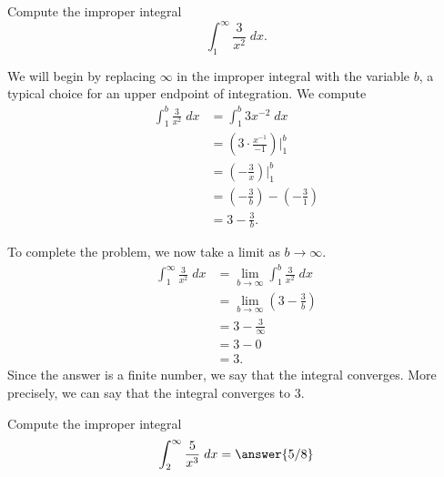 \documentclass{ximera}
\begin{document}
\begin{example}
Compute the improper integral
\[
\int_1^\infty \frac{3}{x^2} \; dx.
\]

We will begin by replacing $\infty$ in the improper integral with the variable $b$, a typical choice for an upper endpoint of integration.
We compute
\begin{align*}
\int_1^b \frac{3}{x^2} \; dx &= \int_1^b 3x^{-2} \; dx\\
                           &= \left(3\cdot \frac{x^{-1}}{-1} \right) \bigg|_1^b\\
                           &= \left(-\frac{3}{x} \right) \bigg|_1^b\\
                       &= \left(-\frac{3}{b} \right) - \left(-\frac{3}{1} \right)\\
                       &=3 - \frac{3}{b}.
\end{align*}
                       
To complete the problem, we now take a limit as $b \to \infty$.
\begin{align*}
\int_1^\infty \frac{3}{x^2} \; dx &= \lim_{b \to \infty}\int_1^b \frac{3}{x^2} \; dx\\
                       &=\lim_{b \to \infty} \left(3 - \frac{3}{b}\right)\\
                       &= 3 -\frac{3}{\infty}\\
                       &= 3 - 0 \\
                       &= 3.
\end{align*}
Since the answer is a finite number, we say that the integral converges.
More precisely, we can say that the integral converges to $3$.

\end{example}



\begin{problem}
Compute the improper integral
\[
\int_2^\infty \frac{5}{x^3} \; dx = \answer{5/8}
\]

\end{problem}
\end{document}

